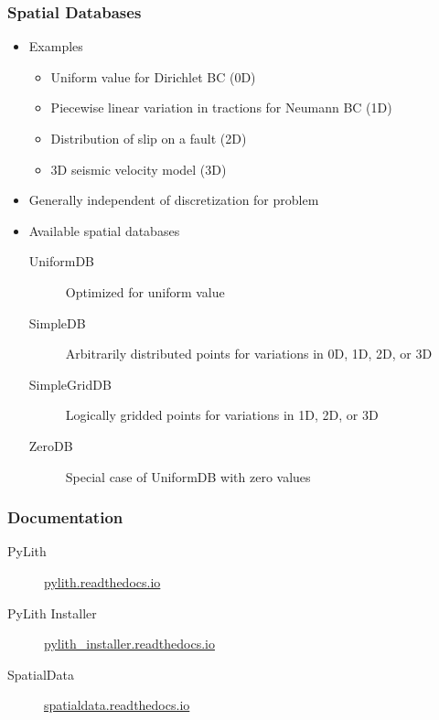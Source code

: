 \documentclass[aspectratio=169]{beamer}
\begin{document}
\begin{frame}
  \frametitle{Spatial Databases}

  \begin{itemize}
 \item Examples
    \begin{itemize}
    \item Uniform value for Dirichlet BC (0D)
    \item Piecewise linear variation in tractions for Neumann BC (1D)
    \item Distribution of slip on a fault (2D)
    \item 3D seismic velocity model (3D)
    \end{itemize}
  \item Generally independent of discretization for problem
  \item Available spatial databases
    \begin{description}
    \item[UniformDB] Optimized for uniform value
    \item[SimpleDB] Arbitrarily distributed points for variations in 0D, 1D, 2D, or 3D
    \item[SimpleGridDB] Logically gridded points for variations in 1D, 2D, or 3D
    \item[ZeroDB] Special case of UniformDB with zero values
    \end{description}
 \end{itemize}

\end{frame}


\begin{frame}
  \frametitle{Documentation}

  \begin{description}
  \item[PyLith] \url{pylith.readthedocs.io}
  \item[PyLith Installer] \url{pylith_installer.readthedocs.io}
  \item[SpatialData] \url{spatialdata.readthedocs.io}
  \end{description}
  
\end{frame}
\end{document}
